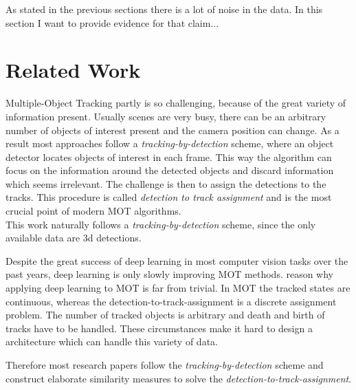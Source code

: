 \documentclass{article}
\begin{document}

As stated in the previous sections there is a lot of noise in the data. In this section I want to provide evidence for that claim...



\section{Related Work}



Multiple-Object Tracking partly is so challenging, because of the great variety of information present. Usually scenes are very busy, there can be an arbitrary number of objects of interest present and the camera position can change. As a result most approaches follow a \emph{tracking-by-detection} scheme, where an object detector locates objects of interest in each frame. This way the algorithm can focus on the information around the detected objects and discard information which seems irrelevant. The challenge is then to assign the detections to the tracks. This procedure is called \emph{detection to track assignment} and is the most crucial point of modern MOT algorithms. \\
This work naturally follows a \emph{tracking-by-detection} scheme, since the only available data are 3d detections.

Despite the great success of deep learning in most computer vision tasks over the past years, deep learning is only slowly improving MOT methods. \cite{milan_rnn_tracking} reason why applying deep learning to MOT is far from trivial. In MOT the tracked states are continuous, whereas the detection-to-track-assignment is a discrete assignment problem. The number of tracked objects is arbitrary and death and birth of tracks have to be handled. These circumstances make it hard to design a architecture which can handle this variety of data.

Therefore most research papers follow the \emph{tracking-by-detection} scheme and construct elaborate similarity measures to solve the \emph{detection-to-track-assignment}. 
\end{document}

